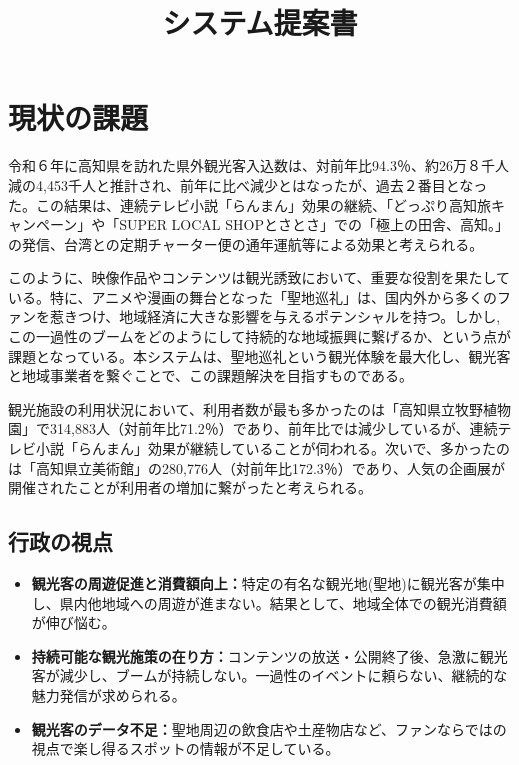 \documentclass{docs}
\title{システム提案書}
\begin{document}
\section{現状の課題}
令和６年に高知県を訪れた県外観光客入込数は、対前年比94.3％、約26万８千人減の4,453千人と推計され、前年に比べ減少とはなったが、過去２番目となった。この結果は、連続テレビ小説「らんまん」効果の継続、「どっぷり高知旅キャンペーン」や「SUPER LOCAL SHOPとさとさ」での「極上の田舎、高知。」の発信、台湾との定期チャーター便の通年運航等による効果と考えられる。

このように、映像作品やコンテンツは観光誘致において、重要な役割を果たしている。特に、アニメや漫画の舞台となった「聖地巡礼」は、国内外から多くのファンを惹きつけ、地域経済に大きな影響を与えるポテンシャルを持つ。しかし,この一過性のブームをどのようにして持続的な地域振興に繋げるか、という点が課題となっている。本システムは、聖地巡礼という観光体験を最大化し、観光客と地域事業者を繋ぐことで、この課題解決を目指すものである。

観光施設の利用状況において、利用者数が最も多かったのは「高知県立牧野植物園」で314,883人（対前年比71.2％）であり、前年比では減少しているが、連続テレビ小説「らんまん」効果が継続していることが伺われる。次いで、多かったのは「高知県立美術館」の280,776人（対前年比172.3％）であり、人気の企画展が開催されたことが利用者の増加に繋がったと考えられる。

\subsection{行政の視点}
\begin{itemize}
	\item \textbf{観光客の周遊促進と消費額向上：}特定の有名な観光地(聖地)に観光客が集中し、県内他地域への周遊が進まない。結果として、地域全体での観光消費額が伸び悩む。
	\item \textbf{持続可能な観光施策の在り方：}コンテンツの放送・公開終了後、急激に観光客が減少し、ブームが持続しない。一過性のイベントに頼らない、継続的な魅力発信が求められる。
	\item \textbf{観光客のデータ不足：}聖地周辺の飲食店や土産物店など、ファンならではの視点で楽し得るスポットの情報が不足している。
\end{itemize}
\end{document}
